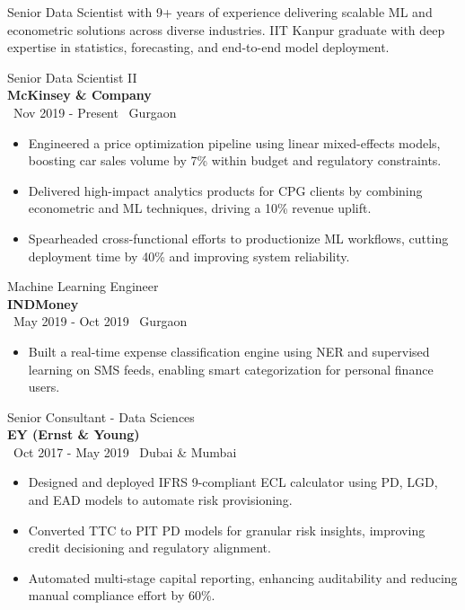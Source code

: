 Senior Data Scientist with 9+ years of experience delivering scalable ML and econometric solutions across diverse industries. IIT Kanpur graduate with deep expertise in statistics, forecasting, and end-to-end model deployment.

{\large Senior Data Scientist II} \\ 
\textbf{McKinsey \& Company} \\
\faCalendar \, Nov 2019 - Present \hfill \faMapMarker \, Gurgaon
\begin{itemize}[itemsep=1pt, topsep=0pt]
    \item Engineered a price optimization pipeline using linear mixed-effects models, boosting car sales volume by 7\% within budget and regulatory constraints.
    \item Delivered high-impact analytics products for CPG clients by combining econometric and ML techniques, driving a 10\% revenue uplift.
    \item Spearheaded cross-functional efforts to productionize ML workflows, cutting deployment time by 40\% and improving system reliability.
\end{itemize}

{\large Machine Learning Engineer} \\
\textbf{INDMoney} \\
\faCalendar \, May 2019 - Oct 2019 \hfill \faMapMarker \, Gurgaon
\begin{itemize}[itemsep=1pt, topsep=0pt]
    \item Built a real-time expense classification engine using NER and supervised learning on SMS feeds, enabling smart categorization for personal finance users.
\end{itemize}

{\large Senior Consultant - Data Sciences} \\
\textbf{EY (Ernst \& Young)} \\
\faCalendar \, Oct 2017 - May 2019 \hfill \faMapMarker \, Dubai \& Mumbai
\begin{itemize}[itemsep=1pt, topsep=0pt]
    \item Designed and deployed IFRS 9-compliant ECL calculator using PD, LGD, and EAD models to automate risk provisioning.
    \item Converted TTC to PIT PD models for granular risk insights, improving credit decisioning and regulatory alignment.
    \item Automated multi-stage capital reporting, enhancing auditability and reducing manual compliance effort by 60\%.
\end{itemize}

